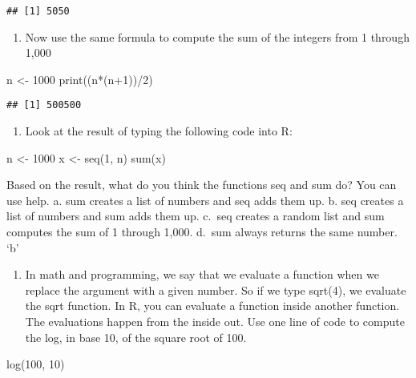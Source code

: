 \documentclass[
]{article}
\newenvironment{Shaded}{\begin{snugshade}}{\end{snugshade}}
\newcommand{\DecValTok}[1]{\textcolor[rgb]{0.00,0.00,0.81}{#1}}
\newcommand{\FunctionTok}[1]{\textcolor[rgb]{0.00,0.00,0.00}{#1}}
\newcommand{\NormalTok}[1]{#1}
\newcommand{\OtherTok}[1]{\textcolor[rgb]{0.56,0.35,0.01}{#1}}
\newcommand{\SpecialCharTok}[1]{\textcolor[rgb]{0.00,0.00,0.00}{#1}}
\providecommand{\tightlist}{%
  \setlength{\itemsep}{0pt}\setlength{\parskip}{0pt}}
\begin{document}
\begin{verbatim}
## [1] 5050
\end{verbatim}

\begin{enumerate}
\def\labelenumi{\arabic{enumi}.}
\setcounter{enumi}{1}
\tightlist
\item
  Now use the same formula to compute the sum of the integers from 1
  through 1,000
\end{enumerate}

\begin{Shaded}
\begin{Highlighting}[]
\NormalTok{n }\OtherTok{\textless{}{-}} \DecValTok{1000}
\FunctionTok{print}\NormalTok{((n}\SpecialCharTok{*}\NormalTok{(n}\SpecialCharTok{+}\DecValTok{1}\NormalTok{))}\SpecialCharTok{/}\DecValTok{2}\NormalTok{)}
\end{Highlighting}
\end{Shaded}

\begin{verbatim}
## [1] 500500
\end{verbatim}

\begin{enumerate}
\def\labelenumi{\arabic{enumi}.}
\setcounter{enumi}{2}
\tightlist
\item
  Look at the result of typing the following code into R:
\end{enumerate}

n \textless- 1000 x \textless- seq(1, n) sum(x)

Based on the result, what do you think the functions seq and sum do? You
can use help. a. sum creates a list of numbers and seq adds them up. b.
seq creates a list of numbers and sum adds them up. c.~seq creates a
random list and sum computes the sum of 1 through 1,000. d.~sum always
returns the same number. `b'

\begin{enumerate}
\def\labelenumi{\arabic{enumi}.}
\setcounter{enumi}{3}
\tightlist
\item
  In math and programming, we say that we evaluate a function when we
  replace the argument with a given number. So if we type sqrt(4), we
  evaluate the sqrt function. In R, you can evaluate a function inside
  another function. The evaluations happen from the inside out. Use one
  line of code to compute the log, in base 10, of the square root of
  100.
\end{enumerate}

\begin{Shaded}
\begin{Highlighting}[]
\FunctionTok{log}\NormalTok{(}\DecValTok{100}\NormalTok{, }\DecValTok{10}\NormalTok{)}
\end{Highlighting}
\end{Shaded}
\end{document}
